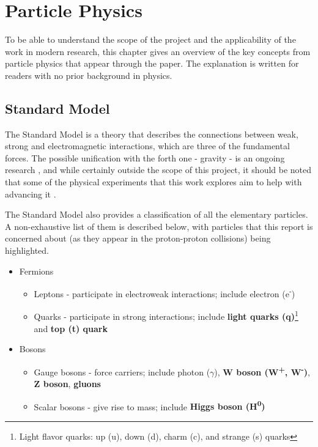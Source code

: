 \section{Particle Physics}
To be able to understand the scope of the project and the applicability of the work in modern research, this chapter gives an overview of the key concepts from particle physics that appear through the paper. The explanation is written for readers with no prior background in physics.

\subsection{Standard Model}
The Standard Model is a theory that describes the connections between weak, strong and electromagnetic interactions, which are three of the fundamental forces. The possible unification with the forth one - gravity - is an ongoing research \cite{67-krasnov2018gravity}, and while certainly outside the scope of this project, it should be noted that some of the physical experiments that this work explores aim to help with advancing it \cite{68-walz2015gbar,69-pagano2020gravity}.

The Standard Model also provides a classification of all the elementary particles. A non-exhaustive list of them is described below, with particles that this report is concerned about (as they appear in the proton-proton collisions) being highlighted.

\begin{itemize}[leftmargin=7mm]
  \item Fermions
  \begin{itemize}[leftmargin=5mm]
    \item Leptons - participate in electroweak interactions; include electron (e\textsuperscript{-})
    \item Quarks - participate in strong interactions; include \textbf{light quarks (q)}\footnote{Light flavor quarks: up (u), down (d), charm (c), and strange (s) quarks} and \textbf{top (t) quark}
  \end{itemize}
  \item Bosons
  \begin{itemize}[leftmargin=5mm]
    \item Gauge bosons - force carriers; include photon ($\gamma$), \textbf{W boson (W\textsuperscript{+}, W\textsuperscript{-})}, \textbf{Z boson}, \textbf{gluons}
    \item Scalar bosons - give rise to mass; include \textbf{Higgs boson (H\textsuperscript{0})}
  \end{itemize}
\end{itemize}

